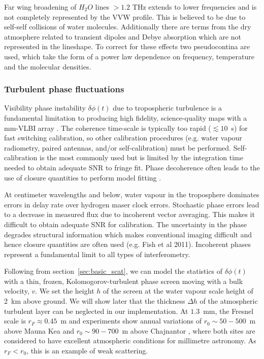 Far wing broadening of $H_2O$ lines $> 1.2$ THz extends to lower frequencies and is not completely represented by the VVW profile. This is believed to be due to self-self collisions of water molecules. Additionally there are terms from the dry atmosphere related to transient dipoles and Debye absorption which are not represented in the lineshape. To correct for these effects two pseudocontina are used, which take the form of a power law dependence on frequency, temperature and the molecular densities. 

\subsubsection{Turbulent phase fluctuations} 

Visibility phase instability  $\delta \phi(t)$ due to tropospheric turbulence is a fundamental limitation to producing high fidelity, science-quality maps with a mm-VLBI array \citep{Thompson_2001}. The coherence time-scale is typically too rapid ($\lesssim10$~s) for fast switching calibration, so other calibration procedures (e.g. water vapour radiometry, paired antennas, and/or self-calibration) must be performed. Self-calibration is the most commonly used but is limited by the integration time needed to obtain adequate SNR to fringe fit. Phase decoherence often leads to the use of closure quantities to perform model fitting \citep{Doeleman_2001,Bower_2004, Shen_2005}.


At centimeter wavelengths and below, water vapour in the troposphere dominates errors in delay rate over hydrogen maser clock errors. Stochastic phase errors lead to a decrease in measured flux due to incoherent vector averaging. This makes it difficult to obtain adequate SNR for calibration. The uncertainty in the phase degrades structural information which makes conventional imaging difficult and hence closure quantities are often used (e.g. Fish et al 2011). Incoherent phases represent a fundamental limit to all types of interferometry. 

Following from section~\ref{sec:basic_scat}, we can model the statistics of $\delta \phi(t)$ with a thin, frozen, Kolomogorov-turbulent phase screen moving with a bulk velocity, $v$.  We set the height $h$ of the screen at the water vapour scale height of 2~km above ground. We will show later that the thickness $\Delta h$ of the atmospheric turbulent layer can be neglected in our implementation. At $1.3$~mm, the Fresnel scale is $r_F \approx 0.45$~m and experiments show annual variations of $r_0 \sim 50 - 500$~m above Mauna Kea \citep{Masson_1994} and $r_0 \sim 90 - 700$~m above Chajnantor \citep*{Radford_1998}, where both sites are considered to have excellent atmospheric conditions for millimetre astronomy. As $r_F < r_0$, this is an example of weak scattering. 


